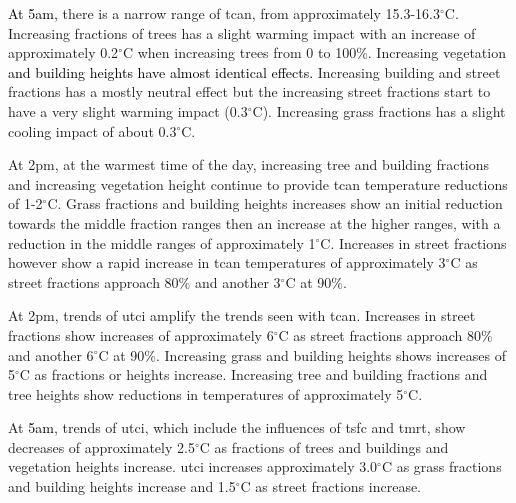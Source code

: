 \documentclass[final,3p,times,authoryear]{elsarticle}
\newcommand{\add}[1]{\textcolor{black}{#1}}
\newcommand{\remove}[1]{\textcolor{red}{\st{}}}
\begin{document}
\remove{During the night-time (represented by 5am),}\add{At 5am,} there is a narrow range of \gls{tcan}, from approximately 15.3-16.3$^{\circ}$C. Increasing fractions of trees has a slight warming impact with an increase of approximately 0.2$^{\circ}$C when increasing trees from 0 to 100\%. Increasing vegetation \remove{height has a similar impact at night-time. Increasing building heights has an almost identical effect.}\add{and building heights have almost identical effects.} Increasing building and street fractions has a mostly neutral effect but\remove{at dawn (5am),} the increasing street fractions start to have a very slight warming impact (0.3$^{\circ}$C). Increasing grass fractions has a slight cooling impact of about 0.3$^{\circ}$C.

At 2pm, at the warmest time of the day, increasing tree and building fractions and increasing vegetation height continue to provide \gls{tcan} temperature reductions of 1-2$^{\circ}$C. Grass fractions and building heights increases show an initial reduction towards the middle fraction ranges then an increase at the higher ranges, with a reduction in the middle ranges of approximately 1$^{\circ}$C. Increases in street fractions however show a rapid increase in \gls{tcan} temperatures of approximately 3$^{\circ}$C as street fractions approach 80\% and another 3$^{\circ}$C at 90\%.

At 2pm, trends of \gls{utci} amplify the trends seen with \gls{tcan}. Increases in street fractions show increases of approximately 6$^{\circ}$C as street fractions approach 80\% and another 6$^{\circ}$C at 90\%. Increasing grass and building heights shows increases of 5$^{\circ}$C as fractions or heights increase. Increasing tree and building fractions and tree heights show reductions in temperatures of approximately 5$^{\circ}$C.

At \remove{night-time}\add{5am}, trends of \gls{utci}, which include the influences of \gls{tsfc} and \gls{tmrt}, show decreases of approximately 2.5$^{\circ}$C as fractions of trees and buildings and vegetation heights increase. \gls{utci} increases approximately 3.0$^{\circ}$C as grass fractions and building heights increase and 1.5$^{\circ}$C as street fractions increase.
\end{document}

